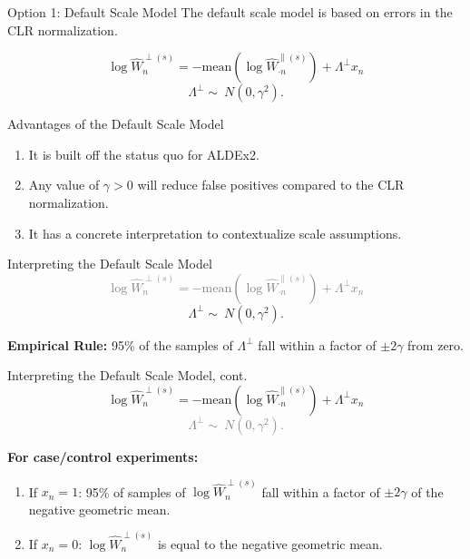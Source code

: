\documentclass[
  ignorenonframetext,
]{beamer}
\begin{document}
\begin{frame}{Option 1: Default Scale Model}
\protect\hypertarget{option-1-default-scale-model}{}
The default scale model is based on errors in the CLR normalization.

\[\log \hat{W}_{n}^{\perp(s)} = - \mathrm{mean} \left(\log \hat{W}^{\parallel (s)}_{\cdot n}\right) + \Lambda^\perp x_{n}\]
\[\Lambda^\perp  \sim \ N(0, \gamma^2).\]
\end{frame}

\begin{frame}{Advantages of the Default Scale Model}
\protect\hypertarget{advantages-of-the-default-scale-model}{}
\begin{enumerate}
\item
  It is built off the status quo for ALDEx2.
\item
  Any value of \(\gamma > 0\) will reduce false positives compared to
  the CLR normalization.
\item
  It has a concrete interpretation to contextualize scale assumptions.
\end{enumerate}
\end{frame}

\begin{frame}{Interpreting the Default Scale Model}
\protect\hypertarget{interpreting-the-default-scale-model}{}
\textcolor{gray}{$$\log \hat{W}_{n}^{\perp(s)} = - \mathrm{mean} \left(\log \hat{W}^{\parallel (s)}_{\cdot n}\right) + \Lambda^\perp x_{n}$$}
\[\Lambda^\perp  \sim \ N(0, \gamma^2).\] \vspace{.1in}

\textbf{Empirical Rule:} 95\% of the samples of \(\Lambda^\perp\) fall
within a factor of \(\pm 2 \gamma\) from zero.
\end{frame}

\begin{frame}{Interpreting the Default Scale Model, cont.}
\protect\hypertarget{interpreting-the-default-scale-model-cont.}{}
\[\log \hat{W}_{n}^{\perp(s)} = - \mathrm{mean} \left(\log \hat{W}^{\parallel (s)}_{\cdot n}\right) + \Lambda^\perp x_{n}\]
\textcolor{gray}{$$\Lambda^\perp  \sim \ N(0, \gamma^2).$$}

\vspace{.1in}

\textbf{For case/control experiments:}

\begin{enumerate}
\item
  If \(x_n = 1\): 95\% of samples of \(\log \hat{W}_{n}^{\perp(s)}\)
  fall within a factor of \(\pm 2 \gamma\) of the negative geometric
  mean.
\item
  If \(x_n = 0\): \(\log \hat{W}_{n}^{\perp(s)}\) is equal to the
  negative geometric mean.
\end{enumerate}
\end{frame}
\end{document}
